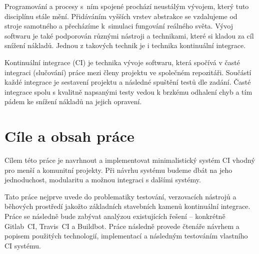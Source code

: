 \begin{introduction}

Programování a procesy s~ním spojené prochází neustálým vývojem, který tuto disciplínu stále mění. 
Přidáváním vyšších vrstev abstrakce se vzdalujeme od stroje samotného a přecházíme k~simulaci fungování reálného světa.
Vývoj softwaru je také podporován různými nástroji a technikami, které si kladou za cíl snížení nákladů.
Jednou z takových technik je i technika kontinuální integrace.

Kontinuální integrace (CI) je technika vývoje softwaru, která spočívá v časté integraci (slučování) práce mezi členy projektu ve společném repozitáři.
Součástí každé integrace je sestavení projektu a následné spuštění testů dle zadání.
Časté integrace spolu s kvalitně napsanými testy vedou k brzkému odhalení chyb a tím pádem ke snížení nákladů na jejich opravení.
\cite{fowler_ci}

\section{Cíle a obsah práce}

Cílem této práce je navrhnout a implementovat minimalistický systém CI vhodný pro menší a komunitní projekty.
Při návrhu systému budeme dbát na jeho jednoduchost, modularitu a možnou integraci s dalšími systémy.

Tato práce nejprve uvede do problematiky testování, verzovacích nástrojů a běhových prostředí jakožto základních stavebních kamenů kontinuální integrace.
Práce se následně bude zabývat analýzou existujících řešení -- konkrétně Gitlab~CI, Travis~CI a Buildbot.
Práce následně provede čtenáře návrhem a popisem použitých technologií, implementací a následným testováním vlastního CI systému.

\end{introduction}
